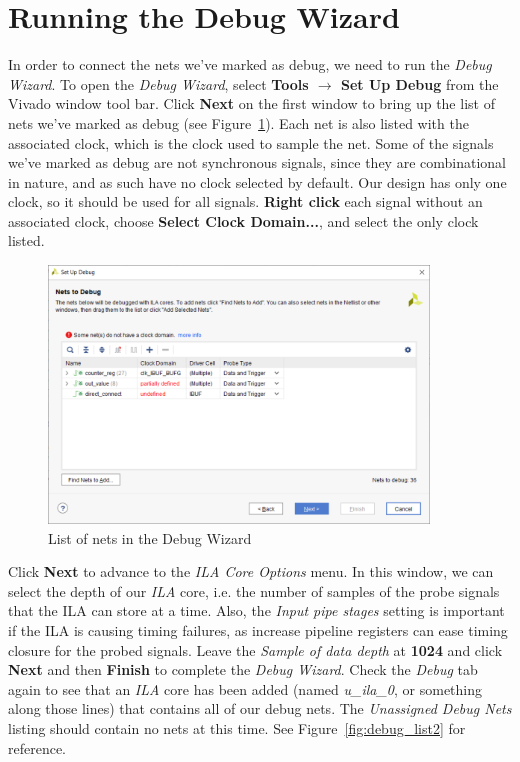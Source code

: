 \documentclass[11pt]{article}
\begin{document}
\section{Running the Debug Wizard}
\label{sec:debug_wiz}
In order to connect the nets we've marked as debug, we need to run the \textit{Debug Wizard}. To open the \textit{Debug Wizard}, select \textbf{Tools $\rightarrow$ Set Up Debug} from the Vivado window tool bar. Click \textbf{Next} on the first window to bring up the list of nets we've marked as debug (see Figure~\ref{fig:debug_wizard}). Each net is also listed with the associated clock, which is the clock used to sample the net. Some of the signals we've marked as debug are not synchronous signals, since they are combinational in nature, and as such have no clock selected by default. Our design has only one clock, so it should be used for all signals. \textbf{Right click} each signal without an associated clock, choose \textbf{Select Clock Domain...}, and select the only clock listed.

\begin{figure}[!h]
    \centering
    \includegraphics[width=0.9\textwidth]{images/debug_wizard.png}
    \caption{List of nets in the Debug Wizard}
    \label{fig:debug_wizard}
\end{figure}

\newpage
Click \textbf{Next} to advance to the \textit{ILA Core Options} menu. In this window, we can select the depth of our \textit{ILA} core, i.e. the number of samples of the probe signals that the ILA can store at a time. Also, the \textit{Input pipe stages} setting is important if the ILA is causing timing failures, as increase pipeline registers can ease timing closure for the probed signals. Leave the \textit{Sample of data depth} at \textbf{1024} and click \textbf{Next} and then \textbf{Finish} to complete the \textit{Debug Wizard}. Check the \textit{Debug} tab again to see that an \textit{ILA} core has been added (named \textit{u\_ila\_0}, or something along those lines) that contains all of our debug nets. The \textit{Unassigned Debug Nets} listing should contain no nets at this time. See Figure~\ref{fig:debug_list2} for reference.
\end{document}
